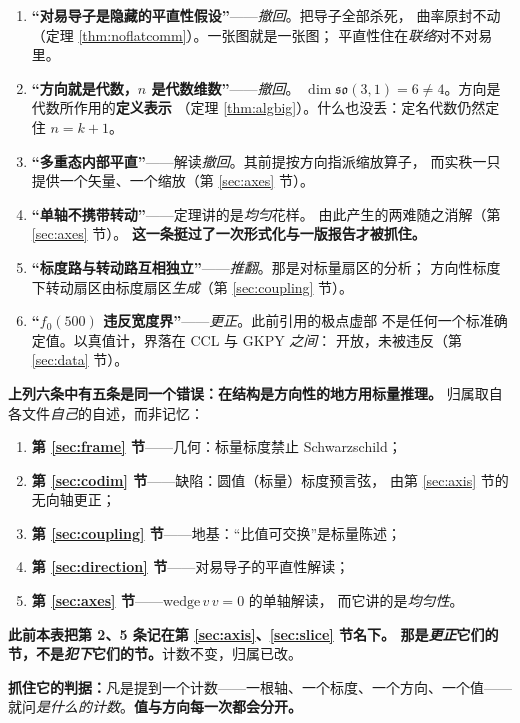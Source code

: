 \documentclass[11pt,a4paper]{article}
\theoremstyle{sudef}
\begin{document}
\begin{enumerate}[leftmargin=1.8em,itemsep=3pt]
\item \textbf{“对易导子是隐藏的平直性假设”}——\emph{撤回}。把导子全部杀死，
      曲率原封不动（定理 \ref{thm:noflatcomm}）。一张图就是一张图；
      平直性住在\emph{联络}对不对易里。
\item \textbf{“方向就是代数，$n$ 是代数维数”}——\emph{撤回}。
      $\dim\mathfrak{so}(3,1)=6\neq4$。方向是代数所作用的\textbf{定义表示}
      （定理 \ref{thm:algbig}）。什么也没丢：定名代数仍然定住 $n=k+1$。
\item \textbf{“多重态内部平直”}——解读\emph{撤回}。其前提按方向指派缩放算子，
      而实秩一只提供一个矢量、一个缩放（第 \ref{sec:axes} 节）。
\item \textbf{“单轴不携带转动”}——定理讲的是\emph{均匀}花样。
      由此产生的两难随之消解（第 \ref{sec:axes} 节）。
      \textbf{这一条挺过了一次形式化与一版报告才被抓住。}
\item \textbf{“标度路与转动路互相独立”}——\emph{推翻}。那是对标量扇区的分析；
      方向性标度下转动扇区由标度扇区\emph{生成}（第 \ref{sec:coupling} 节）。
\item \textbf{“$f_0(500)$ 违反宽度界”}——\emph{更正}。此前引用的极点虚部
      不是任何一个标准确定值。以真值计，界落在 CCL 与 GKPY \emph{之间}：
      开放，未被违反（第 \ref{sec:data} 节）。
\end{enumerate}

\begin{mdframed}[linecolor=red!60!black,linewidth=1pt,backgroundcolor=red!3]
\textbf{上列六条中有五条是同一个错误：在结构是方向性的地方用标量推理。}
归属取自各文件\emph{自己}的自述，而非记忆：

\begin{enumerate}[leftmargin=1.8em,itemsep=1pt]
\item \textbf{第 \ref{sec:frame} 节}——几何：标量标度禁止 Schwarzschild；
\item \textbf{第 \ref{sec:codim} 节}——缺陷：圆值（标量）标度预言弦，
      由第 \ref{sec:axis} 节的无向轴更正；
\item \textbf{第 \ref{sec:coupling} 节}——地基：“比值可交换”是标量陈述；
\item \textbf{第 \ref{sec:direction} 节}——对易导子的平直性解读；
\item \textbf{第 \ref{sec:axes} 节}——$\text{wedge}\,v\,v=0$ 的单轴解读，
      而它讲的是\emph{均匀性}。
\end{enumerate}

\textbf{此前本表把第 2、5 条记在第 \ref{sec:axis}、\ref{sec:slice} 节名下。
那是\emph{更正}它们的节，不是\emph{犯下}它们的节。}计数不变，归属已改。

\textbf{抓住它的判据：}凡是提到一个计数——一根轴、一个标度、一个方向、一个值——
就问\emph{是什么的计数}。\textbf{值与方向每一次都会分开。}
\end{mdframed}
\end{document}
